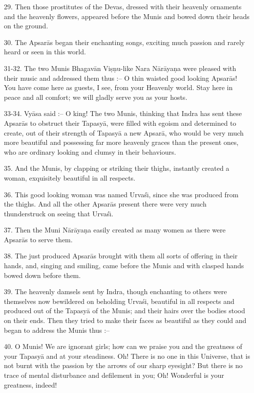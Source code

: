 29. Then those prostitutes of the Devas, dressed with their heavenly ornaments and the heavenly flowers, appeared before the Munis and bowed down their heads on the ground.

30. The Apsar\=as began their enchanting songs, exciting much passion and rarely heard or seen in this world.

31-32. The two Munis Bhagav\=an Vi\d{s}\d{n}u-like Nara N\=ar\=aya\d{n}a were pleased with their music and addressed them thus :-- O thin waisted good looking Apsar\=as! You have come here as guests, I see, from your Heavenly world. Stay here in peace and all comfort; we will gladly serve you as your hosts.

33-34. Vy\=asa said :-- O king! The two Munis, thinking that Indra has sent these Apsar\=as to obstruct their Tapasy\=a, were filled with egoism and determined to create, out of their strength of Tapasy\=a a new Apsar\=a, who would be very much more beautiful and possessing far more heavenly graces than the present ones, who are ordinary looking and clumsy in their behaviours.

35. And the Munis, by clapping or striking their thighs, instantly created a woman, exquisitely beautiful in all respects.

36. This good looking woman was named Urva\'s\={\i}, since she was produced from the thighs. And all the other Apsar\=as present there were very much thunderstruck on seeing that Urva\'s\={\i}.

37. Then the Muni N\=ar\=aya\d{n}a easily created as many women as there were Apsar\=as to serve them.

38. The just produced Apsar\=as brought with them all sorts of offering in their hands, and, singing and smiling, came before the Munis and with clasped hands bowed down before them.

39. The heavenly damsels sent by Indra, though enchanting to others were themselves now bewildered on beholding Urva\'si, beautiful in all respects and produced out of the Tapasy\=a of the Munis; and their hairs over the bodies stood on their ends. Then they tried to make their faces as beautiful as they could and began to address the Munis thus :--

40. O Munis! We are ignorant girls; how can we praise you and the greatness of your Tapasy\=a and at your steadiness. Oh! There is no one in this Universe, that is not burnt with the passion by the arrows of our sharp eyesight? But there is no trace of mental disturbance and defilement in you; Oh! Wonderful is your greatness, indeed!


